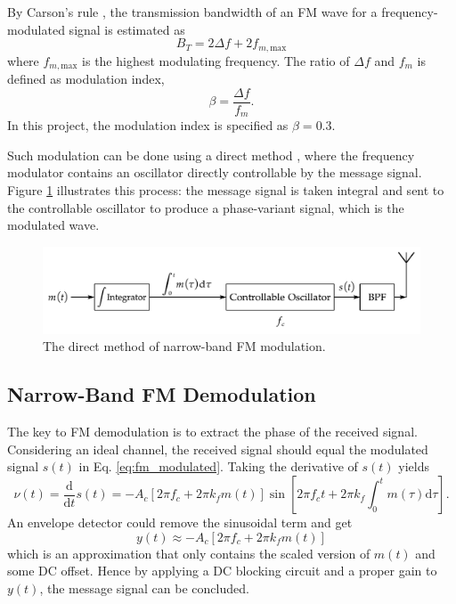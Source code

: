 \documentclass[../ECE459FinalProjectReport.tex]{subfiles}
\begin{document}
By Carson's rule \cites[Sec. 4.6]{haykinIntroductionAnalogDigital2007}{CarsonRule2017}, the transmission bandwidth of an FM wave for a frequency-modulated signal is estimated as
\begin{equation}
    B_T = 2\Delta f + 2f_{m,\mathrm{max}}
\end{equation}
where $f_{m,\mathrm{max}}$ is the highest modulating frequency. The ratio of $\Delta f$ and $f_m$ is defined as modulation index,
\begin{equation}
    \beta = \frac{\Delta f}{f_m}.
\end{equation}
In this project, the modulation index is specified as $\beta=0.3$.

Such modulation can be done using a direct method \cite[Sec. 4.7]{haykinIntroductionAnalogDigital2007}, where the frequency modulator contains an oscillator directly controllable by the message signal. Figure \ref{fig:fm-mod} illustrates this process: the message signal is taken integral and sent to the controllable oscillator to produce a phase-variant signal, which is the modulated wave.


\begin{figure}[tb]
    \centering
    \includegraphics[scale=0.6]{plots/fm_mod.pdf}
    \caption{The direct method of narrow-band FM modulation.}
    \label{fig:fm-mod}
\end{figure}


\subsection{Narrow-Band FM Demodulation}
The key to FM demodulation is to extract the phase of the received signal. Considering an ideal channel, the received signal should equal the modulated signal $s(t)$ in Eq. \eqref{eq:fm_modulated}. Taking the derivative of $s(t)$ yields
\begin{equation}
    \nu \left( t \right) =\frac{\mathrm{d}}{\mathrm{d}t}s\left( t \right) =-A_c\left[ 2\pi f_c+2\pi k_fm\left( t \right) \right] \sin \left[ 2\pi f_ct+2\pi k_f\int_0^t{m\left( \tau \right) \mathrm{d}\tau} \right].
\end{equation}
An envelope detector could remove the sinusoidal term and get
\begin{equation}
    y\left( t \right) \approx -A_c\left[ 2\pi f_c+2\pi k_fm\left( t \right) \right]
\end{equation}
which is an approximation that only contains the scaled version of $m(t)$ and some DC offset. Hence by applying a DC blocking circuit and a proper gain to $y(t)$, the message signal can be concluded.
\end{document}

